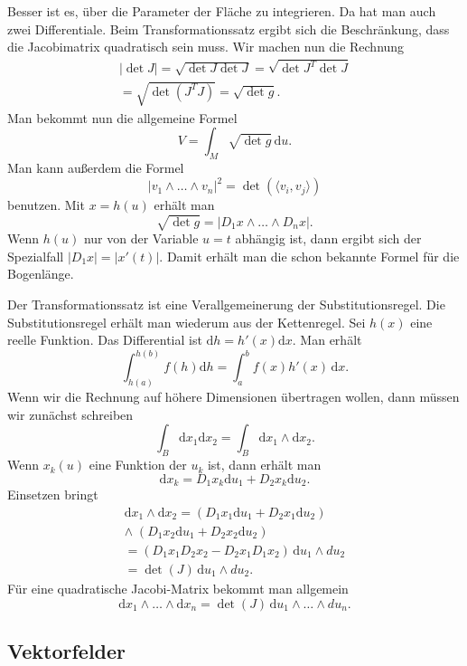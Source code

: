 \documentclass[a4paper,10pt,fleqn,twocolumn,twoside]{article}
\begin{document}
Besser ist es, über die Parameter der Fläche zu integrieren.
Da hat man auch zwei Differentiale. Beim Transformationssatz ergibt
sich die Beschränkung, dass die Jacobimatrix quadratisch sein muss.
Wir machen nun die Rechnung
\begin{gather*}
|{\det J}| = \sqrt{\det J\det J}
= \sqrt{\det J^T\det J}\\
= \sqrt{\det(J^TJ)} = \sqrt{\det g}.
\end{gather*}
Man bekommt nun die allgemeine Formel
\[V = \int_M \sqrt{\det g}\,\mathrm du.\]
Man kann außerdem die Formel
\[|v_1\wedge\ldots\wedge v_n|^2 = \det(\langle v_i,v_j\rangle)\]
benutzen. Mit \(x=h(u)\) erhält man
\[\sqrt{\det g} = |D_1 x\wedge\ldots\wedge D_n x|.\]
Wenn \(h(u)\) nur von der Variable \(u=t\) abhängig ist, dann ergibt
sich der Spezialfall \(|D_1 x| = |x'(t)|\). Damit erhält man die schon
bekannte Formel für die Bogenlänge.

Der Transformationssatz ist eine Verallgemeinerung der
Substitutionsregel. Die Substitutionsregel erhält man wiederum aus
der Kettenregel. Sei \(h(x)\) eine reelle Funktion.
Das Differential ist \(\mathrm dh = h'(x)\mathrm dx\). Man erhält
\[\int_{h(a)}^{h(b)} f(h)\mathrm dh = \int_a^b f(x) h'(x)\,\mathrm dx.\]
Wenn wir die Rechnung auf höhere Dimensionen übertragen wollen, dann
müssen wir zunächst schreiben
\[\int_B \mathrm dx_1\mathrm dx_2 = \int_B \mathrm dx_1\wedge\mathrm dx_2.\]
Wenn \(x_k(u)\) eine Funktion der \(u_k\) ist, dann erhält man
\[\mathrm dx_k = D_1x_k\mathrm du_1+D_2x_k\mathrm du_2.\]
Einsetzen bringt
\begin{gather*}
\mathrm dx_1\wedge\mathrm dx_2
= (D_1x_1\mathrm du_1+D_2x_1\mathrm du_2)\\
\wedge\; (D_1x_2\mathrm du_1+D_2x_2\mathrm du_2)\\
= (D_1 x_1 D_2 x_2 - D_2 x_1 D_1 x_2)\,\mathrm du_1\wedge du_2\\
= \det(J)\,\mathrm du_1\wedge du_2.
\end{gather*}
Für eine quadratische Jacobi-Matrix bekommt man allgemein
\[\mathrm dx_1\wedge\ldots\wedge\mathrm dx_n
= \det(J)\,\mathrm du_1\wedge\ldots\wedge du_n.\]


\subsection{Vektorfelder}
\end{document}
